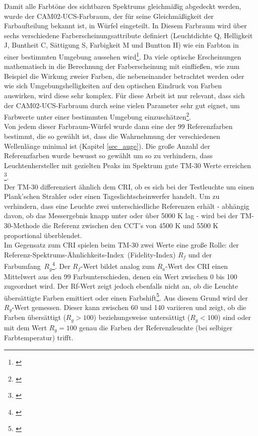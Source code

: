 \noindent Damit alle Farbtöne des sichtbaren Spektrums gleichmäßig abgedeckt werden, wurde der CAM02-UCS-Farbraum, der für seine Gleichmäßigkeit der Farbaufteilung bekannt ist, in Würfel eingeteilt. In Diesem Farbraum wird über sechs verschiedene Farberscheinungsattribute definiert (Leuchtdichte Q, Helligkeit J, Buntheit C, Sättigung S, Farbigkeit M und Buntton H) wie ein Farbton in einer bestimmten Umgebung aussehen wird\footnote{\cite[26-28]{luoli}}. Da viele optische Erscheinungen mathematisch in die Berechnung der Farberscheinung mit einfließen, wie zum Beispiel die Wirkung zweier Farben, die nebeneinander betrachtet werden oder wie sich Umgebungshelligkeiten auf den optischen Eindruck von Farben auswirken, wird diese sehr komplex. Für diese Arbeit ist nur relevant, dass sich der CAM02-UCS-Farbraum durch seine vielen Parameter sehr gut eignet, um Farbwerte unter einer bestimmten Umgebung einzuschätzen\footnote{\cite[19]{luoli}}.\\
Von jedem dieser Farbraum-Würfel wurde dann eine der 99 Referenzfarben bestimmt, die so gewählt ist, dass die Wahrnehmung der verschiedenen Wellenlänge minimal ist (Kapitel \ref{sec_auge}). Die große Anzahl der Referenzfarben wurde bewusst so gewählt um so zu verhindern, dass Leuchtenhersteller mit gezielten Peaks im Spektrum gute TM-30 Werte erreichen \footnote{\cite{usdep}}.\\
Der TM-30 differenziert ähnlich dem CRI, ob es sich bei der Testleuchte um einen Plank'schen Strahler oder einen Tageslichtscheinwerfer handelt. Um zu verhindern, dass eine Leuchte zwei unterschiedliche Referenzen erhält - abhängig davon, ob das Messergebnis knapp unter oder über 5000 K lag - wird bei der TM-30-Methode die Referenz zwischen den CCT's von 4500 K und 5500 K proportional überblendet.\\
Im Gegensatz zum CRI spielen beim TM-30 zwei Werte eine große Rolle: der \glqq Referenz-Spektrums-Ähnlichkeits-Index\grqq\ (Fidelity-Index) $R_{f}$ und der \glqq Farbumfang\grqq\ $R_{g}$\footnote{\cite{production partner}}. Der $R_{f}$-Wert bildet analog zum $R_{a}$-Wert des CRI einen Mittelwert aus den 99 Farbunterschieden, denen ein Wert zwischen 0 bis 100 zugeordnet wird. Der Rf-Wert zeigt jedoch ebenfalls nicht an, ob die Leuchte übersättigte Farben emittiert oder einen Farbshift\footnote{\cite[10]{royerhouser}}. Aus diesem Grund wird der $R_{g}$-Wert gemessen. Dieser kann zwischen 60 und 140 variieren und zeigt, ob die Farben übersättigt ($R_{g} > 100$) beziehungsweise untersättigt ($R_{g} < 100$) sind oder mit dem Wert $R_{g} = 100$ genau die Farben der Referenzleuchte (bei selbiger Farbtemperatur) trifft.\\
